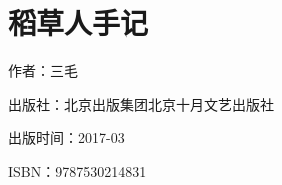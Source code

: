 


\section{稻草人手记}

\par 作者：三毛
\par 出版社：北京出版集团北京十月文艺出版社
\par 出版时间：2017-03
\par ISBN：9787530214831










